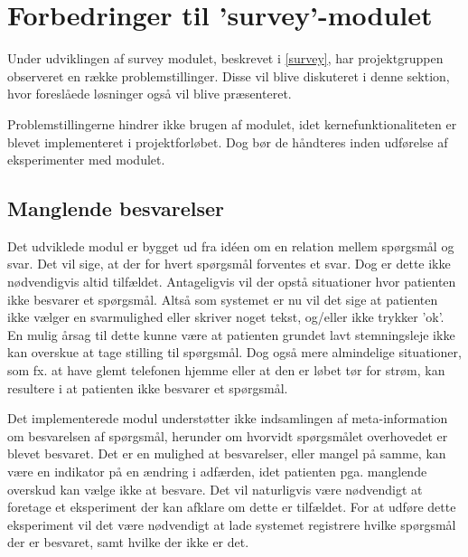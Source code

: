 \label{refleksion}


\section{Forbedringer til 'survey'-modulet}
Under udviklingen af survey modulet, beskrevet i \cref{survey}, har projektgruppen observeret en række problemstillinger.
Disse vil blive diskuteret i denne sektion, hvor foreslåede løsninger også vil blive præsenteret.

Problemstillingerne hindrer ikke brugen af modulet, idet kernefunktionaliteten er blevet implementeret i projektforløbet.
Dog bør de håndteres inden udførelse af eksperimenter med modulet.

\subsection{Manglende besvarelser}\label{reflection:manglende}
Det udviklede modul er bygget ud fra idéen om en relation mellem spørgsmål og svar.
Det vil sige, at der for hvert spørgsmål forventes et svar.
Dog er dette ikke nødvendigvis altid tilfældet.
Antageligvis vil der opstå situationer hvor patienten ikke besvarer et spørgsmål.
Altså som systemet er nu vil det sige at patienten ikke vælger en svarmulighed eller skriver noget tekst, og/eller ikke trykker 'ok'.
En mulig årsag til dette kunne være at patienten grundet lavt stemningsleje ikke kan overskue at tage stilling til spørgsmål.
Dog også mere almindelige situationer, som fx. at have glemt telefonen hjemme eller at den er løbet tør for strøm, kan resultere i at patienten ikke besvarer et spørgsmål.

Det implementerede modul understøtter ikke indsamlingen af meta-information om besvarelsen af spørgsmål, herunder om hvorvidt spørgsmålet overhovedet er blevet besvaret.
Det er en mulighed at besvarelser, eller mangel på samme, kan være en indikator på en ændring i adfærden, idet patienten pga. manglende overskud kan vælge ikke at besvare.
Det vil naturligvis være nødvendigt at foretage et eksperiment der kan afklare om dette er tilfældet.
For at udføre dette eksperiment vil det være nødvendigt at lade systemet registrere hvilke spørgsmål der er besvaret, samt hvilke der ikke er det.

